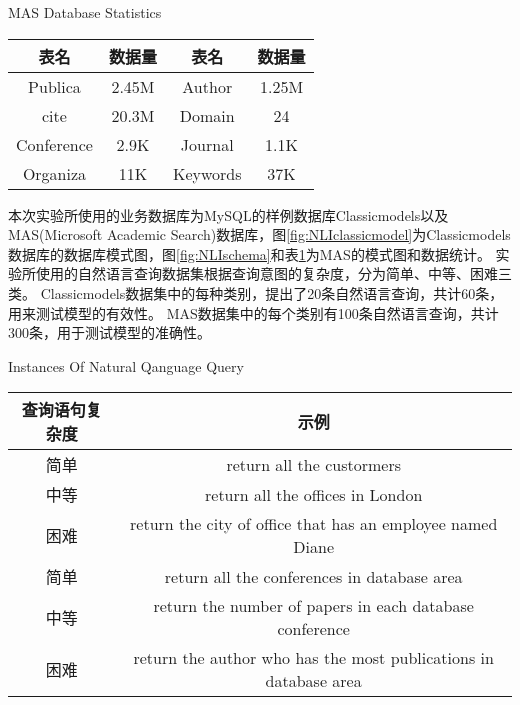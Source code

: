   \begin{table}[!hpb]
    \centering
      {MAS Database Statistics}
    \label{nli:MASsjksjtj}
    \begin{tabular}{|c|c|c|c|} 
      \hline
      表名 & 数据量 & 表名 & 数据量\\
      \hline
      Publica & 2.45M & Author & 1.25M\\
      \hline
      cite & 20.3M & Domain & 24\\
      \hline
      Conference & 2.9K & Journal & 1.1K\\
      \hline
      Organiza & 11K & Keywords & 37K\\
      \hline
    \end{tabular}
  \end{table}


本次实验所使用的业务数据库为MySQL的样例数据库Classicmodels以及MAS(Microsoft Academic Search)数据库，图\ref{fig:NLIclassicmodel}为Classicmodels数据库的数据库模式图，图\ref{fig:NLIschema}和表\ref{nli:MASsjksjtj}为MAS的模式图和数据统计。
实验所使用的自然语言查询数据集根据查询意图的复杂度，分为简单、中等、困难三类。
Classicmodels数据集中的每种类别，提出了20条自然语言查询，共计60条，用来测试模型的有效性。
MAS数据集中的每个类别有100条自然语言查询，共计300条，用于测试模型的准确性。

\begin{table}[!hpb]
  \centering
    {Instances Of Natural Qanguage Query}
  \label{nli:zryycxsl}
  \begin{tabular}{cc} \toprule
    查询语句复杂度 & 示例\\\midrule
    简单 & return all the custormers\\
    中等 & return all the offices in London\\
    困难 & return the city of office that has an employee named Diane\\
    \midrule
    简单 & return all the conferences in database area\\
    中等 & return the number of papers in each database conference\\
    困难 & return the author who has the most publications in database area\\
    \bottomrule
  \end{tabular}
\end{table}

